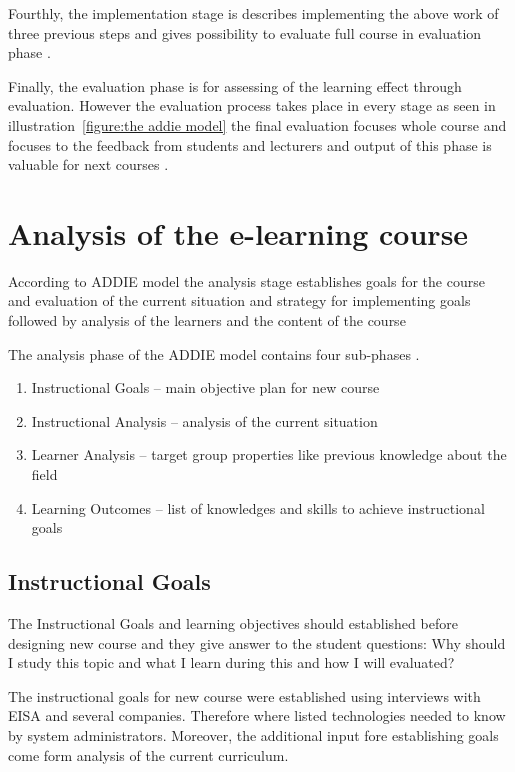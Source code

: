Fourthly, the implementation stage is describes implementing the above work of three previous steps and gives possibility to evaluate full course in evaluation phase \citep{chen2007learning, website:addie}.


Finally, the evaluation phase is for assessing of the learning effect through evaluation. However the evaluation process takes place in every stage as seen in illustration~\ref{figure:the addie model} the final evaluation focuses whole course and focuses to the feedback from students and lecturers and output of this phase is valuable for next courses \citep{OppeArenduskeskus2010, website:addie}.

\section{Analysis of the e-learning course}
According to \gls{ADDIE} model the analysis stage establishes goals for the course and evaluation of the current situation and strategy for implementing goals followed by analysis of the learners and the content of the course \citep{website:addie}

The analysis phase of the \gls{ADDIE} model contains four sub-phases \citep{website:addie}.
\begin{enumerate}
\item Instructional Goals -- main objective plan for new course
\item Instructional Analysis -- analysis of the current situation
\item Learner Analysis -- target group properties like previous knowledge about the field
\item Learning Outcomes -- list of knowledges and skills to achieve instructional goals
\end{enumerate}


\subsection{Instructional Goals}
The Instructional Goals and learning objectives should established before designing new course and they give answer to the student questions: Why should I study this topic and what I learn during this and how I will evaluated? \citep{website:addie}


The instructional goals for new course were established using interviews with \gls{EISA} and several companies. Therefore where listed technologies needed to know by system administrators. Moreover, the additional input fore establishing goals come form analysis of the current curriculum.

